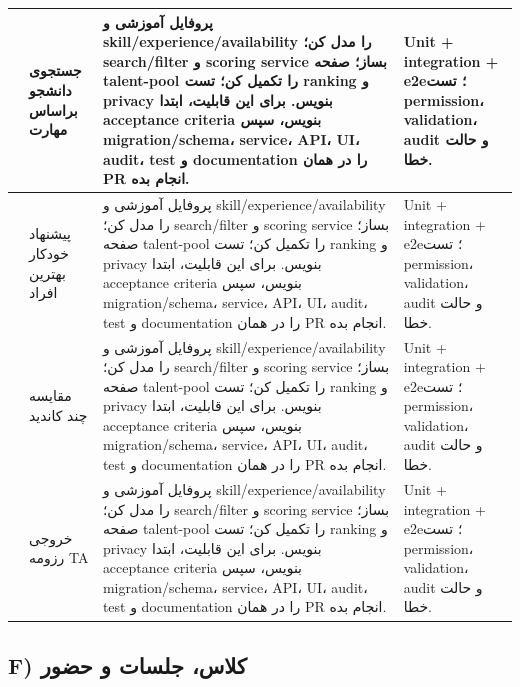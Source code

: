 \documentclass[11pt,a4paper]{article}
\begin{document}
\begin{longtable}{|>{\raggedleft\arraybackslash}p{}|>{\raggedleft\arraybackslash}p{}|>{\raggedleft\arraybackslash}p{}|>{\raggedleft\arraybackslash}p{}|}
87 & جستجوی دانشجو براساس مهارت & پروفایل آموزشی و skill/experience/availability را مدل کن؛ search/filter و scoring service بساز؛ صفحه talent-pool را تکمیل کن؛ تست ranking و privacy بنویس. برای این قابلیت، ابتدا acceptance criteria بنویس، سپس migration/schema، service، API، UI، audit، test و documentation را در همان PR انجام بده. & Unit + integration + e2e؛ تست permission، validation، audit و حالت خطا. \\ \hline
88 & پیشنهاد خودکار بهترین افراد & پروفایل آموزشی و skill/experience/availability را مدل کن؛ search/filter و scoring service بساز؛ صفحه talent-pool را تکمیل کن؛ تست ranking و privacy بنویس. برای این قابلیت، ابتدا acceptance criteria بنویس، سپس migration/schema، service، API، UI، audit، test و documentation را در همان PR انجام بده. & Unit + integration + e2e؛ تست permission، validation، audit و حالت خطا. \\ \hline
89 & مقایسه چند کاندید & پروفایل آموزشی و skill/experience/availability را مدل کن؛ search/filter و scoring service بساز؛ صفحه talent-pool را تکمیل کن؛ تست ranking و privacy بنویس. برای این قابلیت، ابتدا acceptance criteria بنویس، سپس migration/schema، service، API، UI، audit، test و documentation را در همان PR انجام بده. & Unit + integration + e2e؛ تست permission، validation، audit و حالت خطا. \\ \hline
90 & خروجی رزومه TA & پروفایل آموزشی و skill/experience/availability را مدل کن؛ search/filter و scoring service بساز؛ صفحه talent-pool را تکمیل کن؛ تست ranking و privacy بنویس. برای این قابلیت، ابتدا acceptance criteria بنویس، سپس migration/schema، service، API، UI، audit، test و documentation را در همان PR انجام بده. & Unit + integration + e2e؛ تست permission، validation، audit و حالت خطا. \\ \hline
\end{longtable}
\subsection{F) کلاس، جلسات و حضور}
\end{document}
